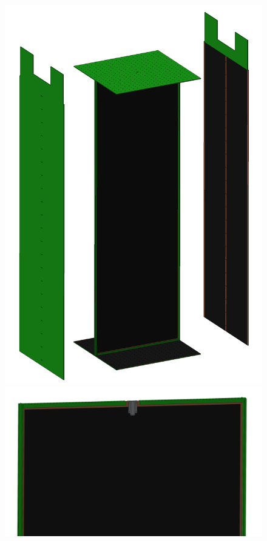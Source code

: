 \begin{figure}[htbp]
\centering
\begin{minipage}[b]{.4\textwidth}
\includegraphics[width=\linewidth]{graphics/lartpc/FieldCage/fc2.PNG}
\end{minipage}
\qquad
\begin{minipage}[b]{.4\textwidth}
\includegraphics[width=\linewidth]{graphics/lartpc/FieldCage/cathodeandhv.PNG}

\end{minipage}
\end{figure}
